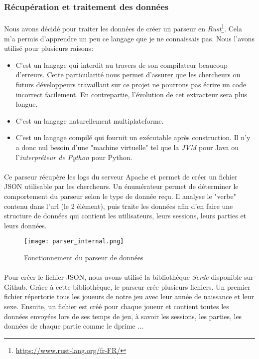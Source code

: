 \subsubsection{Récupération et traitement des données}

\paragraph{}Nous avons décidé pour traiter les données de créer un parseur en \emph{Rust}\footnote{\url{https://www.rust-lang.org/fr-FR/}}. Cela m'a permis d'apprendre un peu ce
langage que je ne connaissais pas. Nous l'avons utilisé pour plusieurs raisons:
\begin{itemize}
    \item C'est un langage qui interdit au travers de son compilateur beaucoup d'erreurs. Cette particularité nous permet d'assurer que les chercheurs ou futurs développeurs
    travaillant sur ce projet ne pourrons pas écrire un code incorrect facilement. En contrepartie, l'évolution de cet extracteur sera plus longue.
    \item C'est un langage naturellement multiplateforme.
    \item C'est un langage compilé qui fournit un exécutable après construction. Il n'y a donc nul besoin d'une "machine virtuelle" tel que la \emph{JVM} pour 
    Java ou l'\emph{interpréteur de Python} pour Python.
\end{itemize}


\paragraph{}Ce parseur récupère les logs du serveur Apache et permet de créer un fichier JSON utilisable par les chercheurs. Un énumérateur permet de déterminer le comportement du
parseur selon le type de donnée reçu. Il analyse le "verbe" contenu dans l'url (le 2 élément), puis traite les données afin d'en faire une structure de données qui contient
les utilisateurs, leurs sessions, leurs parties et leurs données.

\begin{figure}[H]
    \begin{center}
    \texttt{[image: parser\_internal.png]}
    \end{center}
    \caption{Fonctionnement du parseur de données}
\label{DataParser}
\end{figure}

\paragraph{}Pour créer le fichier JSON, nous avons utilisé la bibliothèque \emph{Serde}\cite{JSONRUST} disponible sur Github. Grâce à cette bibliothèque, le parseur crée plusieurs
fichiers. Un premier fichier répertorie tous les joueurs de notre jeu avec leur année de naissance et leur sexe. Ensuite, un fichier est créé pour chaque joueur et contient toutes
les données envoyées lors de ses temps de jeu, à savoir les sessions, les parties, les données de chaque partie comme le dprime ...
